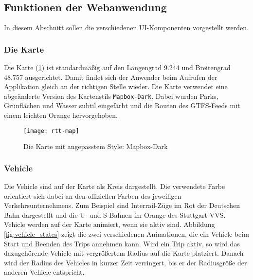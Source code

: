 \subsection{Funktionen der Webanwendung}
\label{sub:funktionen_der_webanwendung}
  In diesem Abschnitt sollen die verschiedenen UI-Komponenten vorgestellt werden.

  \subsubsection*{Die Karte}
  \label{ssub:die_karte}
    Die Karte (\ref{fig:map}) ist standardmäßig auf den Längengrad 9.244 und Breitengrad 48.757 ausgerichtet. Damit findet sich der Anwender beim Aufrufen der Applikation gleich an der richtigen Stelle wieder. Die Karte verwendet eine abgeänderte Version des Kartenstils \texttt{Mapbox-Dark}. Dabei wurden Parks, Grünflächen und Wasser subtil eingefärbt und die Routen des GTFS-Feeds mit einem leichten Orange hervorgehoben.

    \begin{figure}[htbp]
      \begin{center}
        \texttt{[image: rtt-map]}
        \caption{Die Karte mit angepasstem Style: Mapbox-Dark}
        \label{fig:map}
      \end{center}
    \end{figure}
    

  \subsubsection*{Vehicle}
  \label{ssub:vehicle_auf_karte}
    Die Vehicle sind auf der Karte als Kreis dargestellt. Die verwendete Farbe orientiert sich dabei an den offiziellen Farben des jeweiligen Verkehrsunternehmens. Zum Beispiel sind Interrail-Züge im Rot der Deutschen Bahn dargestellt und die U- und S-Bahnen im Orange des Stuttgart-VVS.\\

    Vehicle werden auf der Karte animiert, wenn sie aktiv sind. Abbildung \ref{fig:vehicle_states} zeigt die zwei verschiedenen Animationen, die ein Vehicle beim Start und Beenden des Trips annehmen kann. Wird ein Trip aktiv, so wird das dazugehörende Vehicle mit vergrößertem Radius auf die Karte platziert. Danach wird der Radius des Vehicles in kurzer Zeit verringert, bis er der Radiusgröße der anderen Vehicle entspricht.

